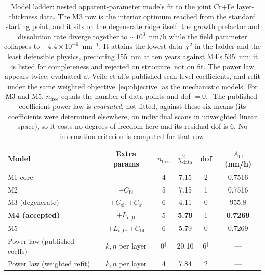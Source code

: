\documentclass[a4paper,fleqn]{cas-sc}
\begin{document}
\begin{table}[htbp]
\centering
\caption{Model ladder: nested apparent-parameter models fit to the
joint Cr+Fe layer-thickness data. The M3 row is the interior optimum
reached from the standard starting point, and it sits on the degenerate
ridge itself: the growth prefactor and dissolution rate diverge together
to $\sim\!10^{3}$~nm/h while the field parameter collapses to
$-4.4\times10^{-6}$~nm$^{-1}$. It attains the lowest data $\chi^2$ in
the ladder and the least defensible physics, predicting 155~nm at ten
years against M4's 535~nm; it is listed for completeness and rejected on
structure, not on fit.
The power law appears twice: evaluated at Veile et al.'s published
scan-level coefficients, and refit under the same weighted
objective~\eqref{eq:objective} as the mechanistic models. For M3 and
M5, $n_\text{free}$ equals the number of data points and dof $=0$.
$^\ddagger$The published-coefficient power law is \emph{evaluated}, not
fitted, against these six means (its coefficients were determined elsewhere, on individual scans in unweighted linear space), so it costs
no degrees of freedom here and its residual dof is 6. No information
criterion is computed for that row.}
\label{tab:ladder}
\small
\begin{tabular}{lccccc}
\toprule
Model & Extra params & $n_\text{free}$ & $\chi^2_\text{data}$ & dof & $A_\text{bl}$ (nm/h) \\
\midrule
M1 core & --- & 4 & 7.15 & 2 & 0.7516 \\
M2 & $+C_\text{bl}$ & 5 & 7.15 & 1 & 0.7516 \\
M3 (degenerate) & $+C_\text{bl}, +C_x$ & 6 & 4.11 & 0 & 955.8 \\
\textbf{M4 (accepted)} & $+L_\text{ol,0}$ & 5 & \textbf{5.79} & 1 & \textbf{0.7269} \\
M5 & $+L_\text{ol,0}, +C_\text{bl}$ & 6 & 5.79 & 0 & 0.7269 \\
Power law (published coeffs) & $k,n$ per layer & 0$^\ddagger$ & 20.10 & 6$^\ddagger$ & --- \\
Power law (weighted refit) & $k,n$ per layer & 4 & 7.84 & 2 & --- \\
\bottomrule
\end{tabular}
\end{table}
\end{document}
